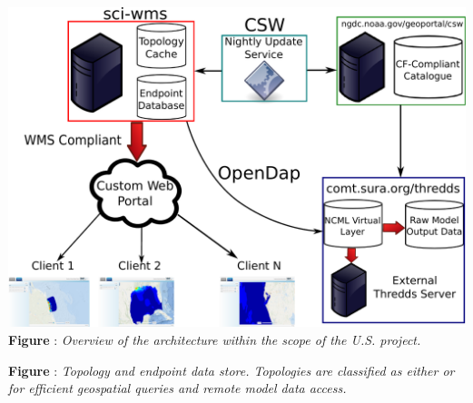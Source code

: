 \documentclass[noback,noborder,portrait,twocolumn]{cuposter}
\begin{document}



\begin{minipage}[t]{0.49\linewidth}
  \centering
  \includegraphics[width=\linewidth]{../figs/overview.pdf}
  \captionspace{}
  \textbf{Figure \getIncFigcounter{}}: \textit{Overview of the \sciwms{} architecture within the scope of the U.S. \ioos{} \comt{} project.}
\end{minipage}
\begin{minipage}[t]{0.49\linewidth}
  \centering
  \textbf{Figure \getIncFigcounter{}}: \textit{Topology and endpoint data store. Topologies are classified as either \cgrid{} or \ugrid{} for efficient geospatial queries and remote model data access.}
\end{minipage}
\end{document}
